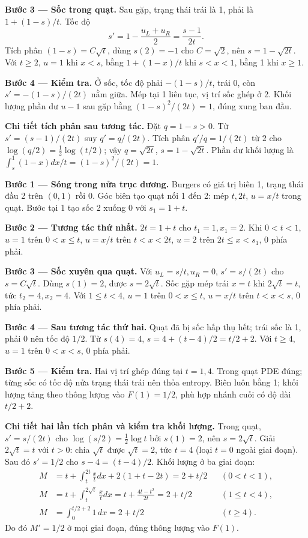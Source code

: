 \textbf{Bước 3 — Sốc trong quạt.} Sau gặp, trạng thái trái là 1, phải là $1+(1-s)/t$. Tốc độ
\[s'=1-\frac{u_L+u_R}{2}=\frac{s-1}{2t}.\]
Tích phân $(1-s)=C\sqrt t$, dùng $s(2)=-1$ cho $C=\sqrt2$, nên $s=1-\sqrt{2t}$. Với $t\ge2$, $u=1$ khi $x<s$, bằng $1+(1-x)/t$ khi $s<x<1$, bằng 1 khi $x\ge1$.

\textbf{Bước 4 — Kiểm tra.} Ở sốc, tốc độ phải $-(1-s)/t$, trái 0, còn $s'=-(1-s)/(2t)$ nằm giữa. Mép tại 1 liên tục, vị trí sốc ghép ở 2. Khối lượng phần dư $u-1$ sau gặp bằng $(1-s)^2/(2t)=1$, đúng xung ban đầu.

\textbf{Chi tiết tích phân sau tương tác.} Đặt $q=1-s>0$. Từ $s'=(s-1)/(2t)$ suy $q'=q/(2t)$. Tích phân $q'/q=1/(2t)$ từ $2$ cho $\log(q/2)=\frac12\log(t/2)$; vậy $q=\sqrt{2t}$, $s=1-\sqrt{2t}$. Phần dư khối lượng là $\int_s^1(1-x)dx/t=(1-s)^2/(2t)=1$.

\textbf{Bước 1 — Sóng trong nửa trục dương.} Burgers có giá trị biên 1, trạng thái đầu 2 trên $(0,1)$ rồi 0. Góc biên tạo quạt nối 1 đến 2: mép $t,2t$, $u=x/t$ trong quạt. Bước tại 1 tạo sốc 2 xuống 0 với $s_1=1+t$.

\textbf{Bước 2 — Tương tác thứ nhất.} $2t=1+t$ cho $t_1=1,x_1=2$. Khi $0<t<1$, $u=1$ trên $0<x\le t$, $u=x/t$ trên $t<x<2t$, $u=2$ trên $2t\le x<s_1$, 0 phía phải.

\textbf{Bước 3 — Sốc xuyên qua quạt.} Với $u_L=s/t,u_R=0$, $s'=s/(2t)$ cho $s=C\sqrt t$. Dùng $s(1)=2$, được $s=2\sqrt t$. Sốc gặp mép trái $x=t$ khi $2\sqrt t=t$, tức $t_2=4,x_2=4$. Với $1\le t<4$, $u=1$ trên $0<x\le t$, $u=x/t$ trên $t<x<s$, 0 phía phải.

\textbf{Bước 4 — Sau tương tác thứ hai.} Quạt đã bị sốc hấp thụ hết; trái sốc là 1, phải 0 nên tốc độ $1/2$. Từ $s(4)=4$, $s=4+(t-4)/2=t/2+2$. Với $t\ge4$, $u=1$ trên $0<x<s$, 0 phía phải.

\textbf{Bước 5 — Kiểm tra.} Hai vị trí ghép đúng tại $t=1,4$. Trong quạt PDE đúng; từng sốc có tốc độ nửa trạng thái trái nên thỏa entropy. Biên luôn bằng 1; khối lượng tăng theo thông lượng vào $F(1)=1/2$, phù hợp nhánh cuối có độ dài $t/2+2$.

\textbf{Chi tiết hai lần tích phân và kiểm tra khối lượng.} Trong quạt, $s'=s/(2t)$ cho $\log(s/2)=\frac12\log t$ bởi $s(1)=2$, nên $s=2\sqrt t$. Giải $2\sqrt t=t$ với $t>0$: chia $\sqrt t$ được $\sqrt t=2$, tức $t=4$ (loại $t=0$ ngoài giai đoạn). Sau đó $s'=1/2$ cho $s-4=(t-4)/2$. Khối lượng ở ba giai đoạn:
\[\begin{aligned}
M&=t+\int_t^{2t}\frac xtdx+2(1+t-2t)=2+t/2 &&(0<t<1),\\
M&=t+\int_t^{2\sqrt t}\frac xtdx=t+\frac{4t-t^2}{2t}=2+t/2 &&(1\le t<4),\\
M&=\int_0^{t/2+2}1\,dx=2+t/2 &&(t\ge4).
\end{aligned}\]
Do đó $M'=1/2$ ở mọi giai đoạn, đúng thông lượng vào $F(1)$.

